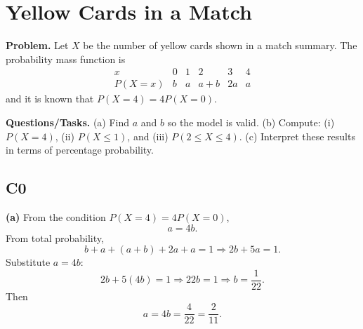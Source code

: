 		\section{Yellow Cards in a Match}
		
			\textbf{Problem.}
		Let $X$ be the number of yellow cards shown in a match summary. The probability mass function is
		\[
		\begin{array}{c|ccccc}
			x & 0 & 1 & 2 & 3 & 4\\
			\hline
			P(X=x) & b & a & a+b & 2a & a
		\end{array}
		\]
		and it is known that $P(X=4)=4P(X=0)$.
		
		\textbf{Questions/Tasks.}
		(a) Find $a$ and $b$ so the model is valid.
		(b) Compute: (i) $P(X=4)$, (ii) $P(X\le 1)$, and (iii) $P(2\le X\le 4)$.
		(c) Interpret these results in terms of percentage probability.
		
		\subsection*{C0}

		\textbf{(a)} From the condition $P(X=4)=4P(X=0)$,
		\[
		a=4b.
		\]
		From total probability,
		\[
		b+a+(a+b)+2a+a=1\Rightarrow 2b+5a=1.
		\]
		Substitute $a=4b$:
		\[
		2b+5(4b)=1\Rightarrow 22b=1\Rightarrow b=\frac{1}{22}.
		\]
		Then
		\[
		a=4b=\frac{4}{22}=\frac{2}{11}.
		\]

